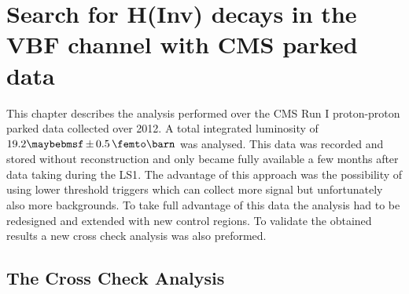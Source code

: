 \chapter{Search for H(Inv) decays in the VBF channel with CMS parked data}
\label{CHAPTER:ParkedDataAnalysis}


%
%
%
%
%
%
%


This chapter describes the analysis performed over the \gls{CMS} Run I proton-proton parked data collected over 2012. A total integrated luminosity of $19.2 \pm 0.5\,\femto\barn$ was analysed. This data was recorded and stored without reconstruction and only became fully available a few months after data taking during the \gls{LS1}. The advantage of this approach was the possibility of using lower threshold triggers which can collect more signal but unfortunately also more backgrounds. To take full advantage of this data the analysis had to be redesigned and extended with new control regions. To validate the obtained results a new cross check analysis was also preformed.

\section{The Cross Check Analysis}
\label{CHAPTER:ParkedDataAnalysis_CrossCheckAnalysis}


